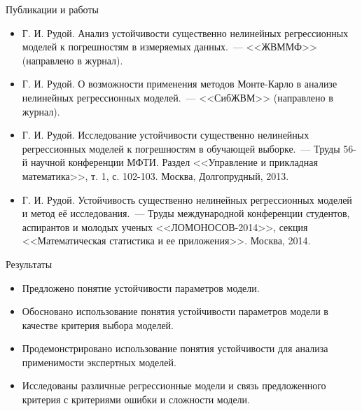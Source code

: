 \documentclass{beamer}
\begin{document}
\begin{frame}{Публикации и работы}
  \begin{itemize}
    \item Г. И. Рудой. Анализ устойчивости существенно нелинейных регрессионных моделей к погрешностям в измеряемых данных.~--- <<ЖВММФ>> (направлено в журнал).
    \item Г. И. Рудой. О возможности применения методов Монте-Карло в анализе нелинейных регрессионных моделей.~--- <<СибЖВМ>> (направлено в журнал).
    \item Г. И. Рудой. Исследование устойчивости существенно нелинейных регрессионных моделей к погрешностям в обучающей выборке.~--- Труды 56-й научной конференции МФТИ. Раздел <<Управление и прикладная математика>>, т. 1, с. 102-103. Москва, Долгопрудный, 2013.
    \item Г. И. Рудой. Устойчивость существенно нелинейных регрессионных моделей и метод её исследования.~--- Труды международной конференции студентов, аспирантов и молодых ученых <<ЛОМОНОСОВ-2014>>, секция <<Математическая статистика и ее приложения>>. Москва, 2014.
  \end{itemize}
\end{frame}

\begin{frame}{Результаты}
  \begin{itemize}
    \item Предложено понятие устойчивости параметров модели.
    \item Обосновано использование понятия устойчивости параметров модели в качестве критерия выбора моделей.
    \item Продемонстрировано использование понятия устойчивости для анализа применимости экспертных моделей.
    \item Исследованы различные регрессионные модели и связь предложенного критерия с критериями ошибки и сложности модели.
  \end{itemize}
\end{frame}
\end{document}
